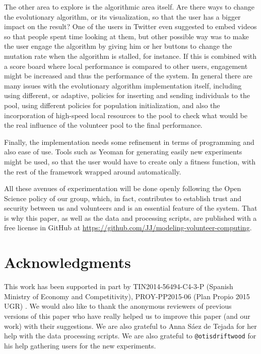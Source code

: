 \documentclass[letterpaper]{article}
\begin{document}
The other area to explore is the algorithmic area itself. Are there
ways to change the evolutionary algorithm, or its visualization, so
that the user has a bigger impact on the result? One of the users in
Twitter even suggested to embed videos so that people spent time
looking at them, but other possible way was to make the user engage
the algorithm by giving him or her buttons to change the mutation rate
when the algorithm is stalled, for instance. If this is combined with
a score board where local performance is compared to other users,
engagement might be increased and thus the performance of the
system. In general there are 
many issues with the evolutionary algorithm implementation itself,
including using different, or adaptive, policies for inserting and
sending individuals to the pool,
using different policies for population initialization, and also the
incorporation of high-speed local resources to the pool to check what
would be the real influence of the volunteer pool to the final
performance. 

Finally, the implementation needs some refinement in terms of
programming and also ease of use. Tools such as Yeoman for generating
easily new experiments might be used, so that the user would have  to
create only a fitness
function, with the rest of the framework wrapped around
automatically. 

All these avenues of experimentation will be done openly following the
Open Science policy of our group, which, in fact, contributes to
establish trust and security between us and volunteers and is an
essential feature of the system. That is why this paper, as well as
the data and processing scripts, are published with a free license in GitHub at
\url{https://github.com/JJ/modeling-volunteer-computing}.

\section*{Acknowledgments}

This work has been supported in part by TIN2014-56494-C4-3-P (Spanish Ministry of Economy and Competitivity),
PROY-PP2015-06 (Plan Propio 2015 UGR)  %
. We would also like to thank the
anonymous reviewers of previous versions of this paper who have really
helped us to improve 
this paper (and our work) with their suggestions. We are also grateful
to Anna S\'aez de Tejada for her help with the data processing
scripts. We are also grateful to {\tt @otisdriftwood} for his help
gathering users for the new experiments. 




\end{document}
